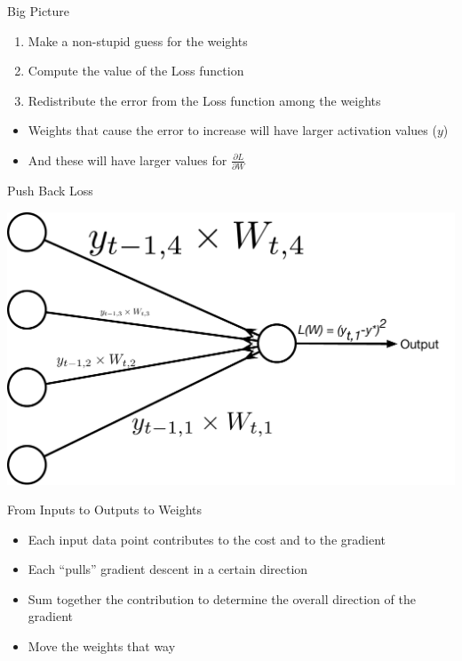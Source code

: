 \documentclass[aspectratio=169]{beamer}
\begin{document}
\begin{frame}{Big Picture}

\begin{enumerate}
	\item Make a non-stupid guess for the weights
	\item Compute the value of the Loss function
	\item Redistribute the error from the Loss function among the weights 
\end{enumerate}
\begin{itemize}
	\item Weights that cause the error to increase will have larger activation values ($y$)
	\item And these will have larger values for $\frac{\partial L}{\partial W}$
\end{itemize}
\end{frame}
\begin{frame}{Push Back Loss}

\includegraphics[width=.65\textwidth]{lectBP/pushBackLoss.pdf}
\end{frame}
\begin{frame}{From Inputs to Outputs to Weights}

\begin{itemize}
	\item Each input data point contributes to the cost and to the gradient
	\item Each ``pulls'' gradient descent in a certain direction
	\item Sum together the contribution to determine the overall direction of the gradient
	\item Move the weights that way
\end{itemize}
\end{frame}
\end{document}
